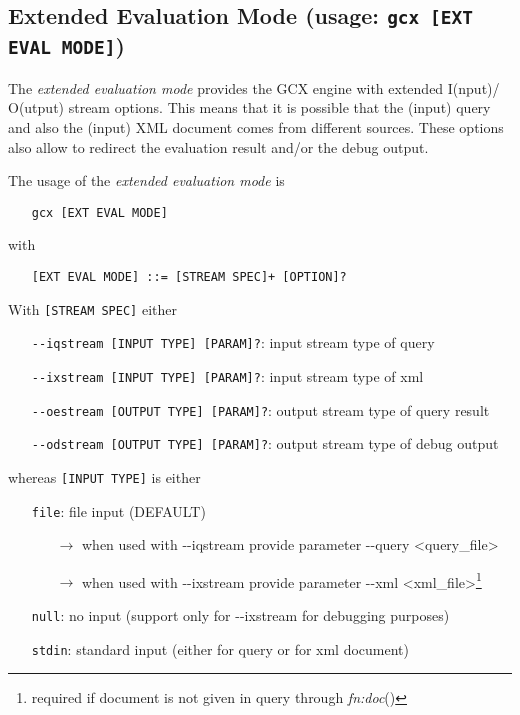 \subsection{Extended Evaluation Mode (usage: \texttt{gcx [EXT EVAL MODE]})}
The \emph{extended evaluation mode} provides the GCX engine with extended I(nput)/ O(utput) stream options. This means that it is possible that the (input) query and also the (input) XML document comes from different sources. These options also allow to redirect the evaluation result and/or the debug output.

\clearpage

\noindent The usage of the \emph{extended evaluation mode} is
\begin{itemize}
  \setlength{\itemsep}{0pt}
  \item[] \texttt{gcx [EXT EVAL MODE]}
\end{itemize}

\noindent with
\begin{itemize}
  \setlength{\itemsep}{0pt}
  \item[] \texttt{[EXT EVAL MODE] ::= [STREAM SPEC]+ [OPTION]?}
\end{itemize}

\noindent With \texttt{[STREAM SPEC]} either
\begin{itemize}
  \setlength{\itemsep}{0pt}
  \item[] \texttt{{-}{-}iqstream [INPUT TYPE] [PARAM]?}: input stream type of query
  \item[] \texttt{{-}{-}ixstream [INPUT TYPE] [PARAM]?}: input stream type of xml
  \item[] \texttt{{-}{-}oestream [OUTPUT TYPE] [PARAM]?}: output stream type of query result
  \item[] \texttt{{-}{-}odstream [OUTPUT TYPE] [PARAM]?}: output stream type of debug output
\end{itemize}

\noindent whereas \texttt{[INPUT TYPE]} is either
\begin{itemize}
  \setlength{\itemsep}{0pt}
  \item[] \texttt{file}: file input (DEFAULT)
  \begin{itemize}
    \setlength{\itemsep}{0pt}
    \item[$\rightarrow$] when used with {-}{-}iqstream provide parameter {-}{-}query <query\_file>
    \item[$\rightarrow$] when used with {-}{-}ixstream provide parameter {-}{-}xml <xml\_file>\footnote{required if document is not given in query through \emph{fn:doc}()}
  \end{itemize}
  \item[] \texttt{null}: no input (support only for {-}{-}ixstream for debugging purposes)
  \item[] \texttt{stdin}: standard input (either for query or for xml document)
\end{itemize}

